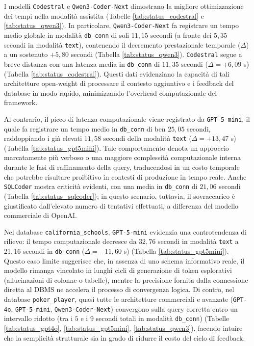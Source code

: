 I modelli \texttt{Codestral} e \texttt{Qwen3-Coder-Next} dimostrano la
migliore ottimizzazione dei tempi nella modalità assistita (Tabelle
\ref{tab:status_codestral} e \ref{tab:status_qwen3}). In particolare, \texttt{Qwen3-Coder-Next} fa registrare
un tempo medio globale in modalità \texttt{db\_conn} di soli \(11,15\)
secondi (a fronte dei \(5,35\) secondi in modalità \texttt{text}),
contenendo il decremento prestazionale temporale (\(\Delta\)) a un
sostenuto \(+5,80\) secondi (Tabella \ref{tab:status_qwen3}). \texttt{Codestral} segue a
breve distanza con una latenza media in \texttt{db\_conn} di \(11,35\)
secondi (\(\Delta = +6,09\) s) (Tabella \ref{tab:status_codestral}). Questi dati evidenziano
la capacità di tali architetture open-weight di processare il
contesto aggiuntivo e i feedback del database in modo
rapido, minimizzando l'overhead computazionale del framework.

Al contrario, il picco di latenza computazionale viene registrato da
\texttt{GPT-5-mini}, il quale fa registrare un tempo medio in
\texttt{db\_conn} di ben \(25,05\) secondi, raddoppiando i già elevati
\(11,58\) secondi della modalità \texttt{text} (\(\Delta = +13,47\) s)
(Tabella \ref{tab:status_gpt5mini}). Tale comportamento denota un approccio marcatamente più
verboso o una maggiore complessità computazionale interna durante le
fasi di raffinamento della query, traducendosi in un costo temporale che
potrebbe risultare proibitivo in contesti di produzione in tempo reale.
Anche \texttt{SQLCoder} mostra criticità evidenti, con una media in
\texttt{db\_conn} di \(21,06\) secondi (Tabella \ref{tab:status_sqlcoder}); in questo
scenario, tuttavia, il sovraccarico è giustificato dall'elevato numero di
tentativi effettuati, a differenza del modello commerciale di OpenAI.

Nel database \texttt{california\_schools}, \texttt{GPT-5-mini} evidenzia
una controtendenza di rilievo: il tempo computazionale decresce da
\(32,76\) secondi in modalità \texttt{text} a \(21,16\) secondi in
\texttt{db\_conn} (\(\Delta = -11,60\) s) (Tabella \ref{tab:status_gpt5mini}). Questo caso
limite suggerisce che, in assenza di uno schema informativo reale, il
modello rimanga vincolato in lunghi cicli di generazione di token
esplorativi (allucinazioni di colonne o tabelle), mentre la precisione
fornita dalla connessione diretta al DBMS ne accelera il processo di
convergenza logica. Di contro, nel database \texttt{poker\_player},
quasi tutte le architetture commerciali e avanzate (\texttt{GPT-4o},
\texttt{GPT-5-mini}, \texttt{Qwen3-Coder-Next}) convergono sulla query
corretta entro un intervallo ridotto (tra i \(5\) e i \(9\) secondi
totali in modalità \texttt{db\_conn}) (Tabelle \ref{tab:status_gpt4o}, \ref{tab:status_gpt5mini}, \ref{tab:status_qwen3}),
facendo intuire che la semplicità strutturale sia in grado di ridurre il costo
del ciclo di feedback.

